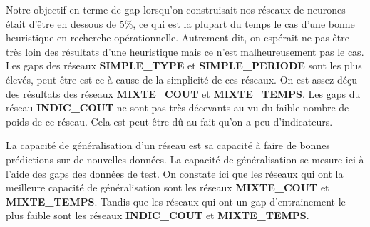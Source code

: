 Notre objectif en terme de gap lorsqu'on construisait nos réseaux de neurones était d'être en dessous de 5\%, ce qui est la plupart du temps le cas d'une bonne heuristique en recherche opérationnelle. Autrement dit, on espérait ne pas être très loin des résultats d'une heuristique mais ce n'est malheureusement pas le cas.
Les gaps des réseaux \textbf{SIMPLE\_TYPE} et \textbf{SIMPLE\_PERIODE} sont les plus élevés, peut-être est-ce à cause de la \og simplicité \fg{} de ces réseaux. 
On est assez déçu des résultats des réseaux \textbf{MIXTE\_COUT} et \textbf{MIXTE\_TEMPS}. %
Les gaps du réseau \textbf{INDIC\_COUT} ne sont pas très décevants au vu du faible nombre de poids de ce réseau. Cela est peut-être dû au fait qu'on a peu d'indicateurs. %

La capacité de généralisation d'un réseau est sa capacité à faire de bonnes prédictions sur de nouvelles données. La capacité de généralisation se mesure ici à l'aide des gaps des données de test. On constate ici que les réseaux qui ont la meilleure capacité de généralisation sont les réseaux \textbf{MIXTE\_COUT} et \textbf{MIXTE\_TEMPS}. Tandis que les réseaux qui ont un gap d'entrainement le plus faible sont les réseaux \textbf{INDIC\_COUT} et \textbf{MIXTE\_TEMPS}.


